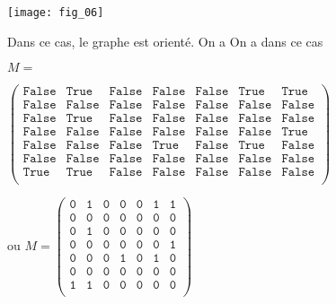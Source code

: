 \begin{exemple}
\begin{minipage}[b]{.47\linewidth}
\end{minipage}\hfill
\begin{minipage}[b]{.47\linewidth}
\begin{center}
\texttt{[image: fig\_06]}
\end{center}
Dans ce cas, le graphe est orienté. On a 
On a dans ce cas 

\footnotesize{$
M = $

$
\begin{pmatrix}
\texttt{False} & \texttt{True} & \texttt{False} & \texttt{False} & \texttt{False} & \texttt{True} & \texttt{True} \\
\texttt{False} & \texttt{False} & \texttt{False} & \texttt{False} & \texttt{False} & \texttt{False} & \texttt{False} \\ 
\texttt{False} & \texttt{True} & \texttt{False} & \texttt{False} & \texttt{False} & \texttt{False} & \texttt{False} \\
\texttt{False} & \texttt{False} & \texttt{False} & \texttt{False} & \texttt{False} & \texttt{False} & \texttt{True} \\
\texttt{False} & \texttt{False} & \texttt{False} & \texttt{True} & \texttt{False} & \texttt{True} & \texttt{False} \\
\texttt{False} & \texttt{False} & \texttt{False} & \texttt{False} & \texttt{False} & \texttt{False} & \texttt{False} \\
\texttt{True} & \texttt{True} & \texttt{False} & \texttt{False} & \texttt{False} & \texttt{False} & \texttt{False} \\
\end{pmatrix}$}

ou 
\footnotesize{$
M =
\begin{pmatrix}
\texttt{0} & \texttt{1} & \texttt{0} & \texttt{0} & \texttt{0} & \texttt{1} & \texttt{1} \\
\texttt{0} & \texttt{0} & \texttt{0} & \texttt{0} & \texttt{0} & \texttt{0} & \texttt{0} \\ 
\texttt{0} & \texttt{1} & \texttt{0} & \texttt{0} & \texttt{0} & \texttt{0} & \texttt{0} \\
\texttt{0} & \texttt{0} & \texttt{0} & \texttt{0} & \texttt{0} & \texttt{0} & \texttt{1} \\
\texttt{0} & \texttt{0} & \texttt{0} & \texttt{1} & \texttt{0} & \texttt{1} & \texttt{0} \\
\texttt{0} & \texttt{0} & \texttt{0} & \texttt{0} & \texttt{0} & \texttt{0} & \texttt{0} \\
\texttt{1} & \texttt{1} & \texttt{0} & \texttt{0} & \texttt{0} & \texttt{0} & \texttt{0} \\
\end{pmatrix}$}

\end{minipage}
\end{exemple}


